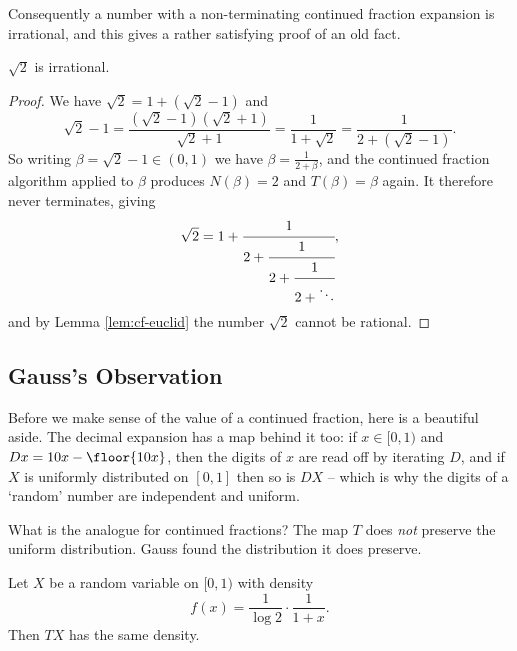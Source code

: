 Consequently a number with a non-terminating continued fraction expansion is irrational, and this gives a rather satisfying proof of an old fact.

\begin{theorem}
	$\sqrt2$ is irrational.
\end{theorem}

\begin{proof}
	We have $\sqrt2 = 1+(\sqrt2-1)$ and
	$$\sqrt2 - 1 = \frac{(\sqrt2-1)(\sqrt2+1)}{\sqrt2+1} = \frac{1}{1+\sqrt2} = \frac{1}{2+(\sqrt2-1)}.$$
	So writing $\beta = \sqrt2-1 \in(0,1)$ we have $\beta = \frac{1}{2+\beta}$, and the continued fraction algorithm applied to $\beta$ produces $N(\beta) = 2$ and $T(\beta)=\beta$ again. It therefore never terminates, giving
	$$\sqrt2 = 1+\cfrac1{2+\cfrac1{2+\cfrac1{2+\ddots}}},$$
	and by Lemma \ref{lem:cf-euclid} the number $\sqrt2$ cannot be rational.
\end{proof}

\subsection{Gauss's Observation}

Before we make sense of the value of a continued fraction, here is a beautiful aside. The decimal expansion has a map behind it too: if $x\in[0,1)$ and $Dx = 10x-\floor{10x}$, then the digits of $x$ are read off by iterating $D$, and if $X$ is uniformly distributed on $[0,1]$ then so is $DX$ -- which is why the digits of a `random' number are independent and uniform.

What is the analogue for continued fractions? The map $T$ does \emph{not} preserve the uniform distribution. Gauss found the distribution it does preserve.

\begin{lemma}[Gauss]\label{lem:gauss-measure}
	Let $X$ be a random variable on $[0,1)$ with density
	$$f(x) = \frac{1}{\log2}\cdot\frac{1}{1+x}.$$
	Then $TX$ has the same density.
\end{lemma}

